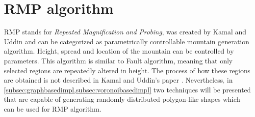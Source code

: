 \documentclass[11pt,a4paper,twoside,openright]{report}
\begin{document}
\section{RMP algorithm}
RMP stands for \emph{Repeated Magnification and Probing}, was created by Kamal and Uddin \cite{Kamal:2007:PCT:1321261.1321264} and can be categorized as parametrically controllable mountain generation algorithm. Height, spread and location of the mountain can be controlled by parameters. This algorithm is similar to Fault algorithm, meaning that only selected regions are repeatedly altered in height. The process of how these regions are obtained is not described in Kamal and Uddin's paper \cite{Kamal:2007:PCT:1321261.1321264}. Nevertheless, in \cref{subsec:graphbasedimpl,subsec:voronoibasedimpl} two techniques will be presented that are capable of generating randomly distributed polygon-like shapes which can be used for RMP algorithm.
\end{document}
